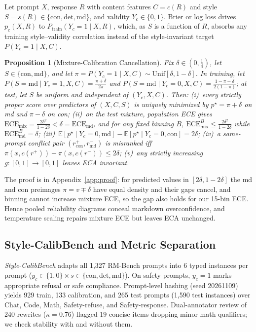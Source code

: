 \documentclass[letterpaper]{article} %
\newtheorem{proposition}{Proposition}
\begin{document}
Let prompt $X$, response $R$ with content features $C=c(R)$ and style $S=s(R)\in\{\mathrm{con},\mathrm{det},\mathrm{md}\}$, and validity $Y_c\in\{0,1\}$. Brier or log loss drives $p_c(X,R)$ to $P_{\mathrm{train}}(Y_c{=}1\mid X,R)$, which, as $S$ is a function of $R$, absorbs any training style--validity correlation instead of the style-invariant target $P(Y_c{=}1\mid X,C)$.

\begin{proposition}[Mixture-Calibration Cancellation]
\label{prop:cancel}
Fix $\delta\in(0,\tfrac14)$, let $S\in\{\mathrm{con},\mathrm{md}\}$, and let $\pi=P(Y_c{=}1\mid X,C)\sim\mathrm{Unif}[\delta,1-\delta]$. In training, let $P(S{=}\mathrm{md}\mid Y_c{=}1,X,C)=\frac{\pi+\delta}{2\pi}$ and $P(S{=}\mathrm{md}\mid Y_c{=}0,X,C)=\frac{1-\pi-\delta}{2(1-\pi)}$; at test, let $S$ be uniform and independent of $(Y_c,X,C)$. Then: (i)~every strictly proper score over predictors of $(X,C,S)$ is uniquely minimized by $p^\star=\pi+\delta$ on md and $\pi-\delta$ on con; (ii)~on the test mixture, population ECE gives $\mathrm{ECE}_{\mathrm{mix}}=\frac{2\delta^2}{1-2\delta}<\delta=\mathrm{ECE}_{\mathrm{md}}$, and for any fixed binning $B$, $\mathrm{ECE}^B_{\mathrm{mix}}\le\frac{2\delta^2}{1-2\delta}$ while $\mathrm{ECE}^B_{\mathrm{md}}=\delta$; (iii)~$\mathbb{E}[p^\star\mid Y_c{=}0,\mathrm{md}]-\mathbb{E}[p^\star\mid Y_c{=}0,\mathrm{con}]=2\delta$; (iv)~a same-prompt conflict pair $(r^+_{\mathrm{con}},r^-_{\mathrm{md}})$ is misranked iff $\pi(x,c(r^+))-\pi(x,c(r^-))\le2\delta$; (v)~any strictly increasing $g:[0,1]\to[0,1]$ leaves ECA invariant.
\end{proposition}

The proof is in Appendix~\ref{app:proof}: for predicted values in $[2\delta,1-2\delta]$ the md and con preimages $\pi=v\mp\delta$ have equal density and their gaps cancel, and binning cannot increase mixture ECE, so the gap also holds for our 15-bin ECE. Hence pooled reliability diagrams conceal markdown overconfidence, and temperature scaling repairs mixture ECE but leaves ECA unchanged.

\subsection{Style-CalibBench and Metric Separation}

\emph{Style-CalibBench} adapts all 1,327 RM-Bench prompts \citep{liu2025rmbench} into $6$ typed instances per prompt ($y_c\in\{1,0\}\times s\in\{\mathrm{con},\mathrm{det},\mathrm{md}\}$). On safety prompts, $y_c{=}1$ marks appropriate refusal or safe compliance. Prompt-level hashing (seed 20261109) yields 929 train, 133 calibration, and 265 test prompts (1,590 test instances) over Chat, Code, Math, Safety-refuse, and Safety-response. Dual-annotator review of 240 rewrites ($\kappa{=}0.76$) flagged 19 concise items dropping minor math qualifiers; we check stability with and without them.
\end{document}
